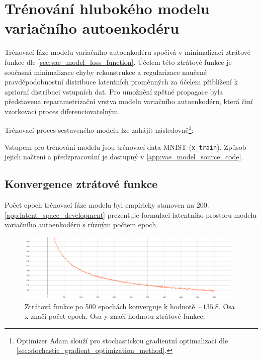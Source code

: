 \section{Trénování hlubokého modelu variačního autoenkodéru}
Trénovací fáze modelu variačního autoenkodéru spočívá v minimalizaci ztrátové funkce dle \autoref{sec:vae_model_loss_function}.
Účelem této ztrátové funkce je současná minimalizace chyby rekonstrukce a regularizace naučené pravděpodobnostní distribuce latentních proměnných za účelem přiblížení k apriorní distribuci vstupních dat.
Pro umožnění zpětné propagace byla představena reparametrizační vrstva modelu variačního autoenkodéru, která činí vzorkovací proces diferenciovatelným.

Trénovací proces sestaveného modelu lze zahájit následovně\footnote{Optimizer Adam slouží pro stochastickou gradientní optimalizaci dle \autoref{sec:stochastic_gradient_optimization_method}.}:


Vstupem pro trénování modelu jsou trénovací data MNIST (\lstinline{x_train}). Způsob jejich načtení a předzpracování je dostupný v \autoref{app:vae_model_source_code}.

\newpage
\subsection{Konvergence ztrátové funkce}
Počet epoch trénovací fáze modelu byl empiricky stanoven na 200. \autoref{app:latent_space_development} prezentuje formulaci latentního prostoru modelu variačního autoenkodéru s různým počtem epoch.
\begin{figure}[H]
    \centering
    \includegraphics[width=0.97\textwidth]{figures/vae_model_total_loss_500_epochs.pdf}
    \caption{Ztrátová funkce po 500 epochách konverguje k hodnotě $\sim 135.8$. Osa x značí počet epoch. Osa y značí hodnotu ztrátové funkce.}
\end{figure}

